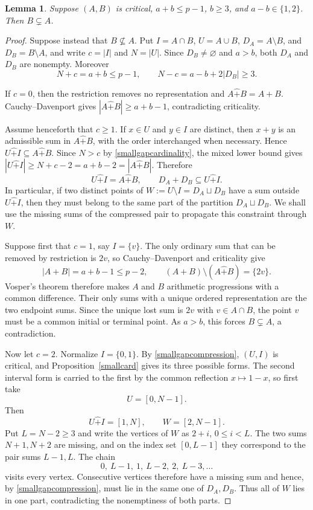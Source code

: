 \documentclass[12pt]{article}
\newtheorem{lemma}{Lemma}[section]
\theoremstyle{remark}
\newcommand{\rs}{\mathbin{\widehat+}}
\begin{document}
\begin{lemma}\label{containment}
Suppose $(A,B)$ is critical, $a+b\le p-1$, $b\ge3$, and
$a-b\in\{1,2\}$.  Then $B\subsetneq A$.
\end{lemma}
\begin{proof}
Suppose instead that $B\nsubseteq A$.  Put
$ I=A\cap B$, $U=A\cup B$, $D_A=A\setminus B$, and
$D_B=B\setminus A$, and write $c=|I|$ and $N=|U|$.
Since $D_B\ne\varnothing$ and $a>b$, both $D_A$ and $D_B$ are nonempty.
Moreover
\begin{equation}\label{smallgapcardinality}
 N+c=a+b\le p-1,
 \qquad
 N-c=a-b+2|D_B|\ge3.
\end{equation}

If $c=0$, then the restriction removes no representation and
$A\rs B=A+B$.  Cauchy--Davenport gives
$|A\rs B|\ge a+b-1$, contradicting criticality.

Assume henceforth that $c\ge1$.  If $x\in U$ and $y\in I$ are distinct,
then $x+y$ is an admissible sum in $A\rs B$, with the order interchanged
when necessary.  Hence $U\rs I\subseteq A\rs B$.  Since $N>c$ by
\eqref{smallgapcardinality}, the mixed lower bound gives
$|U\rs I|\ge N+c-2=a+b-2=|A\rs B|$.  Therefore
\begin{equation}\label{smallgapcompression}
 U\rs I=A\rs B,
 \qquad
 D_A+D_B\subseteq U\rs I.
\end{equation}
In particular, if two distinct points of
$W:=U\setminus I=D_A\sqcup D_B$ have a sum outside $U\rs I$, then they must belong to the same part of
the partition $D_A\sqcup D_B$.  We shall use the missing sums of the
compressed pair to propagate this constraint through $W$.

Suppose first that $c=1$, say $I=\{v\}$.  The only ordinary sum that can
be removed by restriction is $2v$, so Cauchy--Davenport and criticality
give
\[
 |A+B|=a+b-1\le p-2,
 \qquad
 (A+B)\setminus(A\rs B)=\{2v\}.
\]
Vosper's theorem \cite{Vosper1,Vosper2} therefore makes $A$ and $B$
arithmetic progressions with a common difference.  Their only sums with
a unique ordered representation are the two endpoint sums.  Since the
unique lost sum is $2v$ with $v\in A\cap B$, the point $v$ must be a common initial or terminal point.  As $a>b$, this
forces $B\subsetneq A$, a contradiction.

Now let $c=2$.  Normalize $I=\{0,1\}$.  By
\eqref{smallgapcompression}, $(U,I)$ is critical, and
Proposition~\ref{smallcard} gives its three possible forms.  The second
interval form is carried to the first by the common reflection
$x\mapsto1-x$, so first take
\[
 U=[0,N-1].
\]
Then
\[
 U\rs I=[1,N],\qquad W=[2,N-1].
\]
Put $L=N-2\ge3$ and write the vertices of $W$ as $2+i$,
$0\le i<L$.  The two sums $N+1,N+2$ are missing, and on the index set
$[0,L-1]$ they correspond to the pair sums $L-1,L$.  The chain
\[
 0,\ L-1,\ 1,\ L-2,\ 2,\ L-3,\ldots
\]
visits every vertex.  Consecutive vertices therefore have a missing sum
and hence, by \eqref{smallgapcompression}, must lie in the same one of
$D_A,D_B$.  Thus all of $W$ lies in one part, contradicting the
nonemptiness of both parts.


\end{proof}
\end{document}
